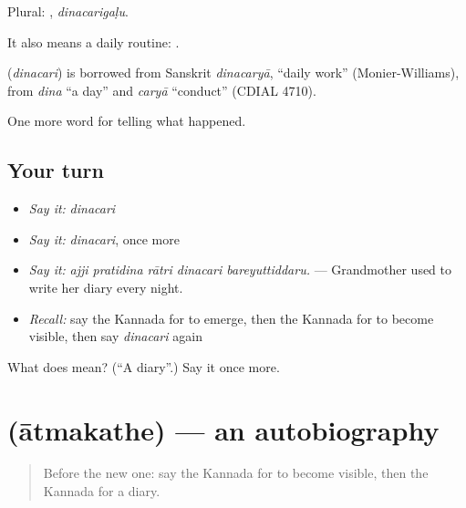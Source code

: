Plural: , \emph{dinacarigaḷu}.

It also means a daily routine:      .

\begin{cousinweb}
\textbf{} (\emph{dinacari}) is borrowed from Sanskrit \emph{dinacaryā}, \textquotedblleft{}daily work\textquotedblright{} (Monier-Williams), from \emph{dina} \textquotedblleft{}a day\textquotedblright{} and \emph{caryā} \textquotedblleft{}conduct\textquotedblright{} (CDIAL 4710).
\end{cousinweb}

\begin{grammarlens}[title={What you've built}]
One more word for telling what happened.
\end{grammarlens}

\subsection*{Your turn}
\begin{itemize}
\raggedright
  \item \emph{Say it:} \emph{dinacari}
  \item \emph{Say it:} \emph{dinacari}, once more
  \item \emph{Say it:} \emph{ajji pratidina rātri dinacari bareyuttiddaru.} — Grandmother used to write her diary every night.
  \item \emph{Recall:} say the Kannada for to emerge, then the Kannada for to become visible, then say \emph{dinacari} again
\end{itemize}

\begin{tcolorbox}[breakable,colback=teal!4,colframe=teal!35!black,title={Before you move on}]
What does  mean? (\textquotedblleft{}A diary\textquotedblright{}.) Say it once more.
\end{tcolorbox}
\section[\texorpdfstring{\kn{ಆತ್ಮಕಥೆ} (ātmakathe)}{ಆತ್ಮಕಥೆ (ātmakathe)}]{ (ātmakathe) — an autobiography}

\label{lesson:KA-C364-atmakathe}



\begin{quote}
Before the new one: say the Kannada for to become visible, then the Kannada for a diary.
\end{quote}

